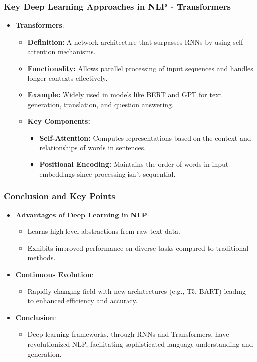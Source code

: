 \documentclass[aspectratio=169]{beamer}
\begin{document}
\begin{frame}[fragile]
    \frametitle{Key Deep Learning Approaches in NLP - Transformers}
    \begin{itemize}
        \item \textbf{Transformers}:
        \begin{itemize}
            \item \textbf{Definition:} A network architecture that surpasses RNNs by using self-attention mechanisms.
            \item \textbf{Functionality:} Allows parallel processing of input sequences and handles longer contexts effectively.
            \item \textbf{Example:} Widely used in models like BERT and GPT for text generation, translation, and question answering.
            \item \textbf{Key Components:}
            \begin{itemize}
                \item \textbf{Self-Attention:} Computes representations based on the context and relationships of words in sentences.
                \item \textbf{Positional Encoding:} Maintains the order of words in input embeddings since processing isn't sequential.
            \end{itemize}
        \end{itemize}
    \end{itemize}
\end{frame}

\begin{frame}[fragile]
    \frametitle{Conclusion and Key Points}
    \begin{itemize}
        \item \textbf{Advantages of Deep Learning in NLP}:
        \begin{itemize}
            \item Learns high-level abstractions from raw text data.
            \item Exhibits improved performance on diverse tasks compared to traditional methods.
        \end{itemize}
        \item \textbf{Continuous Evolution}:
        \begin{itemize}
            \item Rapidly changing field with new architectures (e.g., T5, BART) leading to enhanced efficiency and accuracy.
        \end{itemize}
        \item \textbf{Conclusion}:
        \begin{itemize}
            \item Deep learning frameworks, through RNNs and Transformers, have revolutionized NLP, facilitating sophisticated language understanding and generation.
        \end{itemize}
    \end{itemize}
\end{frame}
\end{document}
